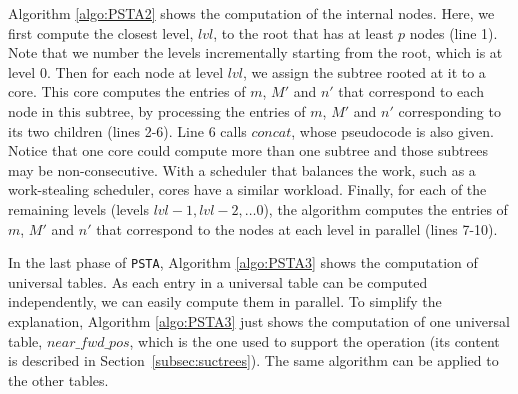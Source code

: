 Algorithm \ref{algo:PSTA2} shows the computation of the internal
nodes.  Here, we first compute the closest level, $lvl$, to the root
that has at least $p$ nodes (line 1).  Note that we number the levels
incrementally starting from the root, which is at level $0$.  Then for
each node at level $lvl$, we assign the subtree rooted at it to a
core.  This core computes the entries of $m$, $M'$ and $n'$ that
correspond to each node in this subtree, by processing the entries of
$m$, $M'$ and $n'$ corresponding to its two children (lines 2-6). Line
6 calls $concat$, whose pseudocode is also given.  Notice that one
core could compute more than one subtree and those subtrees may be
non-consecutive. With a scheduler that balances the work, such as a
work-stealing scheduler, cores have a similar workload.  Finally, for
each of the remaining levels (levels $lvl-1, lvl-2, \ldots 0$), the
algorithm computes the entries of $m$, $M'$ and $n'$ that correspond
to the nodes at each level in parallel (lines 7-10).

In the last phase of {\tt PSTA}, Algorithm \ref{algo:PSTA3} shows the
computation of universal tables.  As each entry in a universal table
can be computed independently, we can easily compute them in parallel.
To simplify the explanation, Algorithm \ref{algo:PSTA3} just shows the
computation of one universal table, $near\_fwd\_pos$, which is the one
used to support the {\fwdsearch} operation (its content is described
in Section~\ref{subsec:suctrees}). The same algorithm can be applied
to the other tables.
